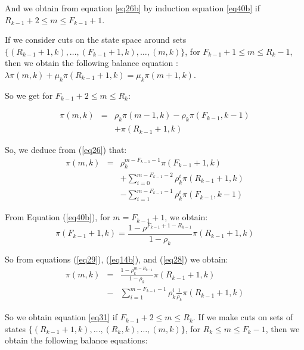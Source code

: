 \documentclass[conference]{IEEEtran}
\begin{document}
\noindent And we obtain from equation \ref{eq26b} by induction equation \ref{eq40b} if 
$R_{k-1}+2 \leq m \leq F_{k-1}+1$.


\noindent
If we consider cuts on the state space around sets $\{(R_{k-1}+1,k), \ldots,(F_{k-1}+1,k),\ldots,(m,k)\}$, for  $F_{k-1}+1 \leq m \leq R_{k}-1$,
then we obtain the following balance equation : $\lambda \pi(m,k) + \mu_k \pi(R_{k-1}+1,k)=\mu_k \pi(m+1,k)$.
 



\noindent So  we get for  $F_{k-1}+2 \leq m \leq R_{k}$:


\begin{eqnarray}
\pi(m,k) &=& \rho_k \pi(m-1,k)-\rho_k \pi(F_{k-1},k-1) \nonumber\\
&&+ \pi(R_{k-1}+1,k)
\label{eq26}
\end{eqnarray}



\noindent So, we deduce from (\ref{eq26}) that:
\begin{eqnarray}
\pi(m,k)&=& \rho_k^{m-F_{k-1}-1}\pi(F_{k-1}+1,k) \nonumber\\
&&+
\sum_{i=0}^{m-F_{k-1}-2} \rho_k^i\pi(R_{k-1}+1,k) \nonumber \\ 
&& -\sum_{i=1}^{m-F_{k-1}-1} \rho_k^i \pi(F_{k-1},k-1)
\label{eq28}
\end{eqnarray}


From Equation (\ref{eq40b}), for $m=F_{k-1}+1$, we obtain:
\begin{equation}
\pi(F_{k-1}+1,k)=\frac{1-\rho^{ F_{k-1}+1-R_{k-1}} }{1-\rho_k}\pi(R_{k-1}+1,k)
\label{eq29}
\end{equation}

So from equations (\ref{eq29}), (\ref{eq14b}), and (\ref{eq28})  we obtain:
\begin{eqnarray}
\pi(m,k)&=&\frac{1-\rho_k^{m-R_{k-1}} } {1-\rho_k} \pi(R_{k-1}+1,k) \nonumber\\
&-& \sum_{i=1}^{m-F_{k-1}-1} \rho_k^i \frac{1}{\rho_k} \pi(R_{k-1}+1,k)
\label{eq30}
\end{eqnarray}

So we obtain equation \ref{eq31} if $F_{k-1}+2 \leq m \leq R_{k}$. If we make cuts on sets of states $\{(R_{k-1}+1,k),\ldots,(R_{k},k),\ldots, (m,k)\}$, for $R_k \leq m \leq F_k-1$, then we obtain the following balance equations:
\end{document}
